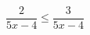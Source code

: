\begin{ex}[type=inequality]
	\begin{condition}
		\( \dfrac{2}{5x-4}\le\dfrac{3}{5x-4} \)
	\end{condition}
\end{ex}